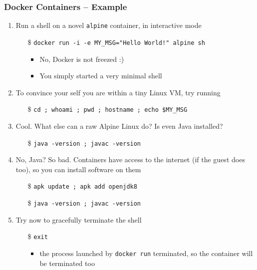 \documentclass[handout]{beamer}\mode<presentation>{\usetheme{AMSCesenaBleu}}
\begin{document}
\begin{frame}[allowframebreaks]
\frametitle{Docker Containers -- Example}

    \begin{enumerate}
        \item Run a shell on a novel \texttt{alpine} container, in interactive mode
        \begin{itemize}
            \item[\$] \texttt{docker run -i -e MY\_MSG="Hello World!" alpine sh}
            \begin{itemize}
                \item No, Docker is not freezed :)
                \item You simply started a \alert{very minimal} shell
            \end{itemize}
        \end{itemize}
        \item To convince your self you are within a tiny Linux VM, try running
        \begin{itemize}
            \item[\$] \texttt{cd ; whoami ; pwd ; hostname ; echo \$MY\_MSG}
        \end{itemize}
        \item Cool. What else can a raw Alpine Linux do? Is even Java installed? 
        \begin{itemize}
            \item[\$] \texttt{java -version ; javac -version}
        \end{itemize}
        \item No, Java? So bad. Containers have access to the internet (if the guest does too), so you can install software on them
        \begin{itemize}
            \item[\$] \texttt{apk update ; apk add openjdk8} 
            \item[\$] \texttt{java -version ; javac -version}
        \end{itemize}
        
        \framebreak
        
        \item Try now to gracefully terminate the shell
        \begin{itemize}
            \item[\$] \texttt{exit}
            \begin{itemize}
                \item the process launched by \texttt{docker run} terminated, so the container will be terminated too
            \end{itemize}
        \end{itemize}
        

\end{enumerate}
\end{frame}
\end{document}
